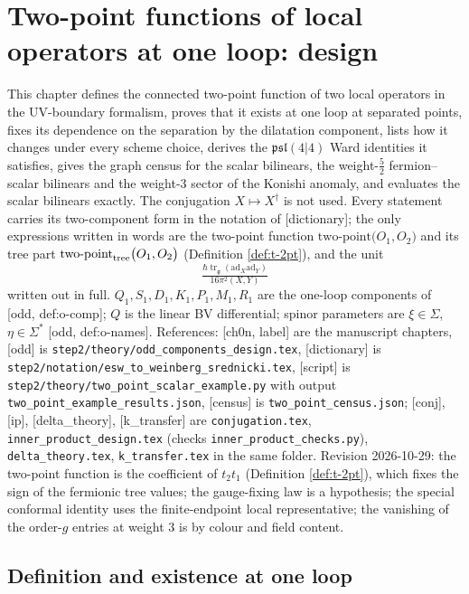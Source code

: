 \documentclass[11pt]{report}
\theoremstyle{plain}
\theoremstyle{definition}
\numberwithin{equation}{chapter}
\newcommand{\unit}{\tfrac{\hbar\operatorname{tr}_{\mathfrak g}(\mathrm{ad}_X\mathrm{ad}_Y)}{16\pi^2(X,Y)}}
\newcommand{\TP}[2]{\mathrm{two\mbox{-}point}\big(#1,#2\big)}
\newcommand{\TPz}[2]{\mathrm{two\mbox{-}point}_{\rm tree}\big(#1,#2\big)}
\begin{document}
\setcounter{chapter}{9}
\chapter{Two-point functions of local operators at one loop: design}

This chapter defines the connected two-point function of two local operators in the UV-boundary formalism, proves that it exists at one loop at separated points, fixes its dependence on the separation by the dilatation component, lists how it changes under every scheme choice, derives the $\mathfrak{psl}(4|4)$ Ward identities it satisfies, gives the graph census for the scalar bilinears, the weight-$\tfrac52$ fermion--scalar bilinears and the weight-$3$ sector of the Konishi anomaly, and evaluates the scalar bilinears exactly. The conjugation $X\mapsto X^\dagger$ is not used. Every statement carries its two-component form in the notation of [dictionary]; the only expressions written in words are the two-point function $\TP{O_1}{O_2}$ and its tree part $\TPz{O_1}{O_2}$ (Definition \ref{def:t-2pt}), and the unit
\[
\unit
\]
written out in full. $Q_1,S_1,D_1,K_1,P_1,M_1,R_1$ are the one-loop components of [odd, def:o-comp]; $Q$ is the linear BV differential; spinor parameters are $\xi\in\Sigma$, $\eta\in\Sigma^*$ [odd, def:o-names]. References: [ch0n, label] are the manuscript chapters, [odd] is \texttt{step2/theory/odd\_components\_design.tex}, [dictionary] is \texttt{step2/notation/esw\_to\_weinberg\_srednicki.tex}, [script] is \texttt{step2/theory/two\_point\_scalar\_example.py} with output \texttt{two\_point\_example\_results.json}, [census] is \texttt{two\_point\_census.json}; [conj], [ip], [delta\_theory], [k\_transfer] are \texttt{conjugation.tex}, \texttt{inner\_product\_design.tex} (checks \texttt{inner\_product\_checks.py}), \texttt{delta\_theory.tex}, \texttt{k\_transfer.tex} in the same folder. Revision 2026-10-29: the two-point function is the coefficient of $t_2t_1$ (Definition \ref{def:t-2pt}), which fixes the sign of the fermionic tree values; the gauge-fixing law is a hypothesis; the special conformal identity uses the finite-endpoint local representative; the vanishing of the order-$g$ entries at weight $3$ is by colour and field content.
\section{Definition and existence at one loop}
\end{document}
